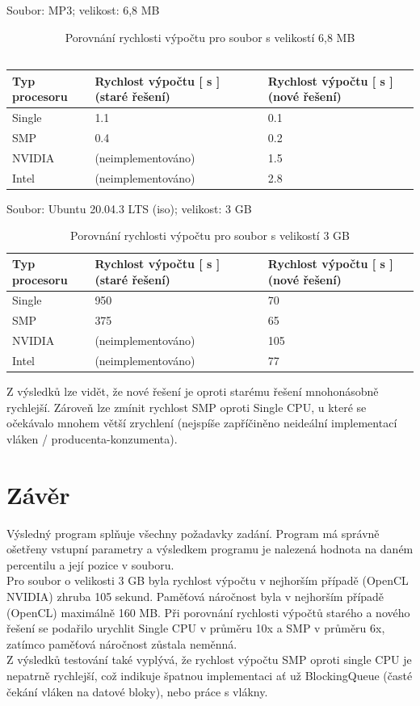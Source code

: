\documentclass[12pt, a4paper]{article}
\begin{document}
\noindent Soubor: MP3; velikost: 6,8 MB
\begin{table}[h!]
\centering
\begin{tabular}{ |p{3cm}||p{4cm}|p{4cm}|  }
 \hline
 Typ procesoru& Rychlost výpočtu [ s ] (staré řešení)  & Rychlost výpočtu [ s ] (nové řešení)\\
 \hline
 Single   & 1.1    &0.1\\ 
 SMP &   0.4  & 0.2 \\
 NVIDIA &(neimplementováno) & 1.5\\
 Intel  & (neimplementováno)    &2.8\\
 \hline
\end{tabular}
\caption{Porovnání rychlosti výpočtu pro soubor s velikostí 6,8 MB\\\\}
\end{table}

\noindent Soubor: Ubuntu 20.04.3 LTS (iso); velikost: 3 GB
\begin{table}[h!]
\centering
\begin{tabular}{ |p{3cm}||p{4cm}|p{4cm}|  }
 \hline
 Typ procesoru& Rychlost výpočtu [ s ] (staré řešení)  & Rychlost výpočtu [ s ] (nové řešení)\\
 \hline
 Single   & 950    &70\\ 
 SMP &   375  & 65 \\
 NVIDIA &(neimplementováno) & 105\\
 Intel  & (neimplementováno)    &77\\
 \hline
\end{tabular}
\caption{Porovnání rychlosti výpočtu pro soubor s velikostí 3 GB\\}
\end{table}

\noindent Z výsledků lze vidět, že nové řešení je oproti starému řešení mnohonásobně rychlejší. Zároveň lze zmínit rychlost SMP oproti Single CPU, u které se očekávalo mnohem větší zrychlení (nejspíše zapříčiněno neideální implementací vláken / producenta-konzumenta).

\newpage

\section{Závěr}
Výsledný program splňuje všechny požadavky zadání. Program má správně ošetřeny vstupní parametry a výsledkem programu je nalezená hodnota na daném percentilu a její pozice v souboru.\\
\indent Pro soubor o velikosti 3 GB byla rychlost výpočtu v nejhorším případě (OpenCL NVIDIA) zhruba 105 sekund. Paměťová náročnost byla v nejhorším případě (OpenCL) maximálně 160 MB. Při porovnání rychlosti výpočtů starého a nového řešení se podařilo urychlit Single CPU v průměru 10x a SMP v průměru 6x, zatímco paměťová náročnost zůstala neměnná. \\
\indent Z výsledků testování také vyplývá, že rychlost výpočtu SMP oproti single CPU je nepatrně rychlejší, což indikuje špatnou implementaci ať už BlockingQueue (časté čekání vláken na datové bloky), nebo práce s vlákny.
\newpage
	
\end{document}
